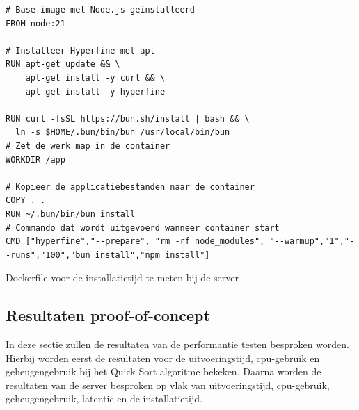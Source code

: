 \begin{listing}[H]
  \centering
  \begin{verbatim}
# Base image met Node.js geïnstalleerd
FROM node:21

# Installeer Hyperfine met apt
RUN apt-get update && \
    apt-get install -y curl && \
    apt-get install -y hyperfine

RUN curl -fsSL https://bun.sh/install | bash && \
  ln -s $HOME/.bun/bin/bun /usr/local/bin/bun
# Zet de werk map in de container
WORKDIR /app

# Kopieer de applicatiebestanden naar de container
COPY . .
RUN ~/.bun/bin/bun install
# Commando dat wordt uitgevoerd wanneer container start
CMD ["hyperfine","--prepare", "rm -rf node_modules", "--warmup","1","--runs","100","bun install","npm install"]
      \end{verbatim}
      \caption{\label{code:dockerinstall}Dockerfile voor de installatietijd te meten bij de server}
\end{listing}

\subsection{Resultaten proof-of-concept}
In deze sectie zullen de resultaten van de performantie testen besproken worden.
Hierbij worden eerst de resultaten voor de uitvoeringstijd, cpu-gebruik en geheugengebruik bij het Quick Sort algoritme bekeken.
Daarna worden de resultaten van de server besproken op vlak van uitvoeringstijd, cpu-gebruik, geheugengebruik, latentie en de installatietijd.

